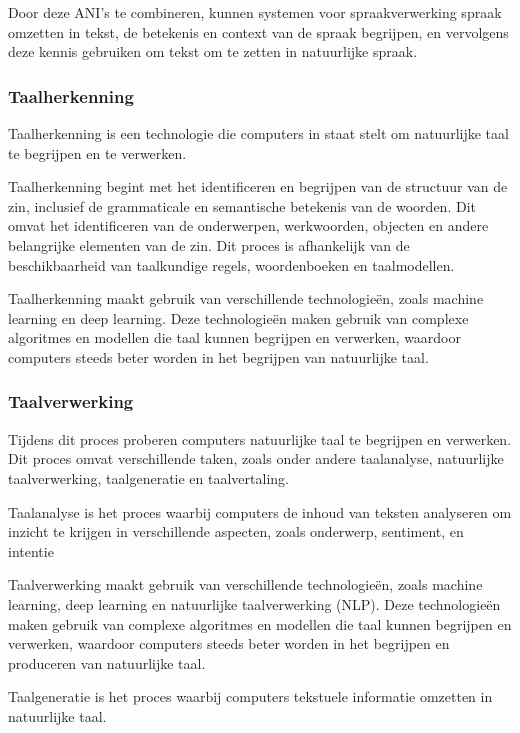 Door deze ANI's te combineren, kunnen systemen voor spraakverwerking spraak omzetten in tekst, de betekenis en context van de spraak begrijpen, en vervolgens deze kennis gebruiken om tekst om te zetten in natuurlijke spraak.

\subsubsection{Taalherkenning}

Taalherkenning is een technologie die computers in staat stelt om natuurlijke taal te begrijpen en te verwerken.

Taalherkenning begint met het identificeren en begrijpen van de structuur van de zin, inclusief de grammaticale en semantische betekenis van de woorden. Dit omvat het identificeren van de onderwerpen, werkwoorden, objecten en andere belangrijke elementen van de zin. Dit proces is afhankelijk van de beschikbaarheid van taalkundige regels, woordenboeken en taalmodellen.

Taalherkenning maakt gebruik van verschillende technologieën, zoals machine learning en deep learning. Deze technologieën maken gebruik van complexe algoritmes en modellen die taal kunnen begrijpen en verwerken, waardoor computers steeds beter worden in het begrijpen van natuurlijke taal.

\subsubsection{Taalverwerking}

Tijdens dit proces proberen computers natuurlijke taal te begrijpen en verwerken. Dit proces omvat verschillende taken, zoals onder andere taalanalyse, natuurlijke taalverwerking, taalgeneratie en taalvertaling.

Taalanalyse is het proces waarbij computers de inhoud van teksten analyseren om inzicht te krijgen in verschillende aspecten, zoals onderwerp, sentiment, en intentie

Taalverwerking maakt gebruik van verschillende technologieën, zoals machine learning, deep learning en natuurlijke taalverwerking (NLP). Deze technologieën maken gebruik van complexe algoritmes en modellen die taal kunnen begrijpen en verwerken, waardoor computers steeds beter worden in het begrijpen en produceren van natuurlijke taal.
 
Taalgeneratie is het proces waarbij computers tekstuele informatie omzetten in natuurlijke taal.

